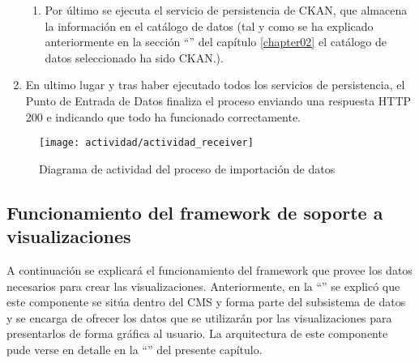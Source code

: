 \begin{enumerate}
\begin{enumerate}
			\item Por último se ejecuta el servicio de persistencia de CKAN, que almacena la información en el catálogo de datos (tal y como se ha explicado anteriormente en la sección ``'' del capítulo \ref{chapter02} el catálogo de datos seleccionado ha sido CKAN.).
		\end{enumerate}
	\item En ultimo lugar y tras haber ejecutado todos los servicios de persistencia, el Punto de Entrada de Datos finaliza el proceso enviando una respuesta HTTP 200 e indicando que todo ha funcionado correctamente.
\end{enumerate}
\begin{figure}[h]
	\centering
	\texttt{[image: actividad/actividad\_receiver]}
	\caption{Diagrama de actividad del proceso de importación de datos}
	\label{fig:diagrama_actividad_receiver}
\end{figure}



\subsection{Funcionamiento del framework de soporte a visualizaciones}
\label{actividad:framework_visualizaciones}
A continuación se explicará el funcionamiento del framework que provee los datos necesarios para crear las visualizaciones.  Anteriormente, en la ``'' se explicó que este componente se sitúa dentro del CMS y forma parte del subsistema de datos y se encarga de ofrecer los datos que se utilizarán por las visualizaciones para presentarlos de forma gráfica al usuario.  La arquitectura de este componente pude verse en detalle en la  ``'' del presente capítulo.

